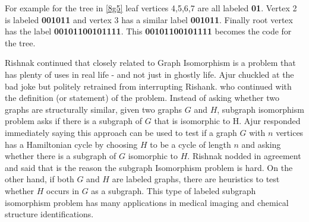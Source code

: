 For example for the tree in \ref{8g5} leaf vertices 4,5,6,7 are all labeled \textbf{01}. Vertex 2 is labeled \textbf{001011} and vertex 3 has a similar label \textbf{001011}. Finally root vertex has the label \textbf{00101100101111}. This \textbf{00101100101111} becomes the code for the tree.

Rishnak continued that closely related to Graph Isomorphism is a problem that has plenty of uses in real life - and not just in ghostly life. Ajur chuckled at the bad joke but politely retrained from interrupting Rishank. who continued with the definition (or statement)  of the problem.  Instead of asking whether two graphs are structurally similar, given two graphs $G$ and $H$, subgraph isomorphism problem asks if there is a subgraph of $G$ that is isomorphic to H. Ajur responded immediately saying this approach can be used to test if a graph $G$ with $n$ vertices has a Hamiltonian cycle by choosing $H$ to be a cycle of length $n$ and asking whether there is a subgraph of $G$ isomorphic to $H$. Rishnak nodded in agreement and said that is the reason the subgraph Isomorphism problem is hard. On the other hand, if both $G$ and $H$ are labeled graphs, there are heuristics to test whether $H$ occurs in $G$ as a subgraph. This type of labeled subgraph isomorphism problem has many applications in medical imaging and chemical structure identifications.

